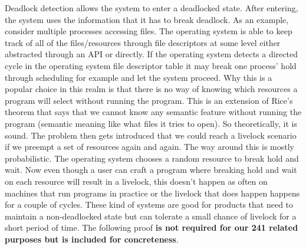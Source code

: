 Deadlock detection allows the system to enter a deadlocked state.
After entering, the system uses the information that it has to break deadlock.
As an example, consider multiple processes accessing files.
The operating system is able to keep track of all of the files/resources through file descriptors at some level either abstracted through an API or directly.
If the operating system detects a directed cycle in the operating system file descriptor table it may break one process' hold through scheduling for example and let the system proceed.
Why this is a popular choice in this realm is that there is no way of knowing which resources a program will select without running the program.
This is an extension of Rice's theorem \cite{rice} that says that we cannot know any semantic feature without running the program (semantic meaning like what files it tries to open).
So theoretically, it is sound.
The problem then gets introduced that we could reach a livelock scenario if we preempt a set of resources again and again.
The way around this is mostly probabilistic.
The operating system chooses a random resource to break hold and wait.
Now even though a user can craft a program where breaking hold and wait on each resource will result in a livelock, this doesn't happen as often on machines that run programs in practice or the livelock that does happen happens for a couple of cycles.
These kind of systems are good for products that need to maintain a non-deadlocked state but can tolerate a small chance of livelock for a short period of time.
The following proof \textbf{is not required for our 241 related purposes but is included for concreteness}.


